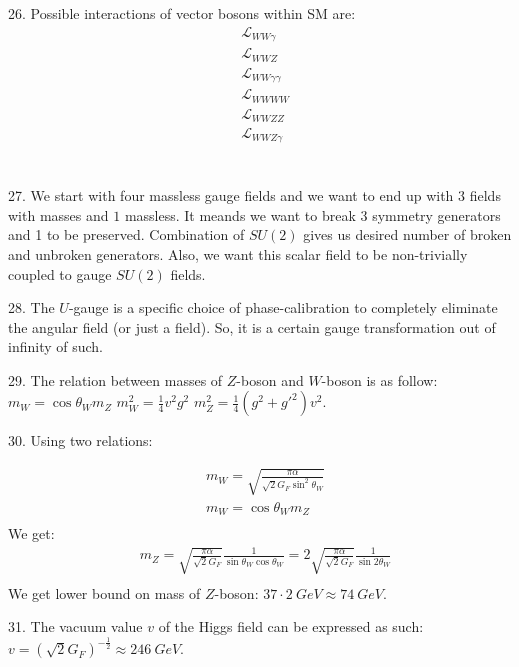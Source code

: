 26. Possible interactions of vector bosons within SM are:
\begin{equation}
\begin{split}
&\mathcal{L}_{WW\gamma}\\
&\mathcal{L}_{WWZ}\\
&\mathcal{L}_{WW\gamma\gamma}\\
&\mathcal{L}_{WWWW}\\
&\mathcal{L}_{WWZZ}\\
&\mathcal{L}_{WWZ\gamma}\\
\end{split}
\end{equation}\

27. We start with four massless gauge fields and we want to end up with $3$ fields with masses and $1$ massless. It meands we want to break $3$ symmetry generators and 1 to be preserved. Combination of $SU(2)$ gives us desired number of broken and unbroken generators. Also, we want this scalar field to be non-trivially coupled to gauge $SU(2)$ fields. 

28. The $U$-gauge is a specific choice of phase-calibration to completely eliminate the angular field (or just a field). So, it is a certain gauge transformation out of infinity of such. 

29. The relation between masses of $Z$-boson and $W$-boson is as follow: $m_W = \cos \theta _W m_Z$ $m_W^2=\frac{1}{4}v^2 g^2$  $m_Z^2=\frac{1}{4}(g^2+g'^2)v^2$.

30. Using two relations:

\begin{equation}
\begin{split}
&m_W = \sqrt{\frac{\pi\alpha}{\sqrt{2}G_F\sin^2\theta_W}}\\
&m_W = \cos\theta_W m_Z\\
\end{split}
\end{equation}
We get:
\begin{equation}
\begin{split}
&m_Z  =\sqrt{\frac{\pi\alpha}{\sqrt{2}G_F}}\frac{1}{\sin\theta_W \cos\theta_W}=2\sqrt{\frac{\pi\alpha}{\sqrt{2}G_F}}\frac{1}{\sin2\theta_W } \\
\end{split}
\end{equation}
We get lower bound on mass of $Z$-boson: $37\cdot 2\ GeV\approx 74 \ GeV$.

31. The vacuum value $v$ of the Higgs field can be expressed as such: $v=(\sqrt{2}G_F)^{-\frac{1}{2}}\approx 246\ GeV$. 

